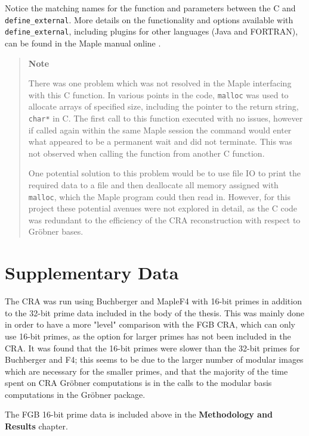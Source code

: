 \documentclass[letterpaper,12pt,titlepage,oneside,final]{book}
\newenvironment{note}{\begin{quote}%
  \textbf{Note }%
  \quad
}{%
\end{quote}%
}
\begin{document}
\begin{appendices}
\noindent Notice the matching names for the function and parameters between the C and \\\texttt{define\_external}.  More details on the functionality and options available with \\\texttt{define\_external}, including plugins for other languages (Java and FORTRAN), \\can be found in the Maple manual online \cite{Maple}. 

\begin{note}
  There was one problem which was not resolved in the Maple interfacing with this C function.  In various points in the code, \texttt{malloc} was used to allocate arrays of specified size, including the pointer to the return string, \texttt{char*} in C.  The first call to this function executed with no issues, however if called again within the same Maple session the command would enter what appeared to be a permanent wait and did not terminate.  This was not observed when calling the function from another C function.

  One potential solution to this problem would be to use file IO to print the required data to a file and then deallocate all memory assigned with \texttt{malloc}, which the Maple program could then read in.  However, for this project these potential avenues were not explored in detail, as the C code was redundant to the efficiency of the CRA reconstruction with respect to Gr\"obner bases.   
\end{note}

\chapter{Supplementary Data}\label{appendix:supplData}

The CRA was run using Buchberger and MapleF4 with 16-bit primes in addition to the 32-bit prime data included in the body of the thesis.  This was mainly done in order to have a more "level" comparison with the FGB CRA, which can only use 16-bit primes, as the option for larger primes has not been included in the CRA.  It was found that the 16-bit primes were slower than the 32-bit primes for Buchberger and F4; this seems to be due to the larger number of modular images which are necessary for the smaller primes, and that the majority of the time spent on CRA Gr\"obner computations is in the calls to the modular basis computations in the Gr\"obner package.

The FGB 16-bit prime data is included above in the \textbf{Methodology and Results} chapter.  


\end{appendices}
\end{document}
